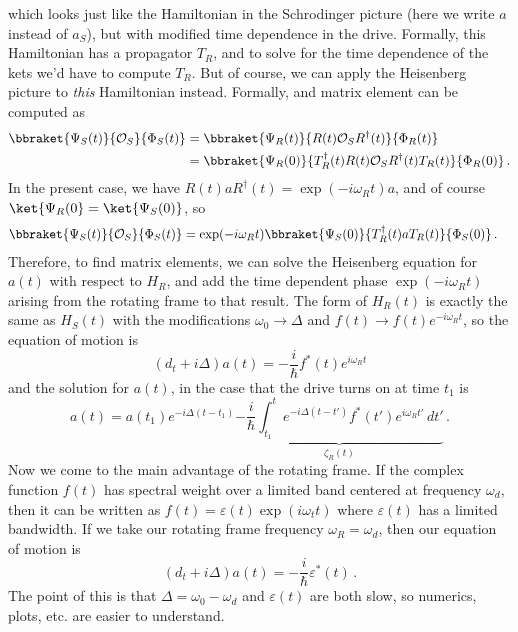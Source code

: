 which looks just like the Hamiltonian in the Schrodinger picture (here we write $a$ instead of $a_S$), but with modified time dependence in the drive.
Formally, this Hamiltonian has a propagator $T_R$, and to solve for the time dependence of the kets we'd have to compute $T_R$.
But of course, we can apply the Heisenberg picture to \emph{this} Hamiltonian instead.
Formally, and matrix element can be computed as
\begin{align*}
  \bbraket{\Psi_S(t)}{\mathcal{O}_S}{\Phi_S(t)}
  &= \bbraket{\Psi_R(t)}{R(t) \mathcal{O}_S R^\dagger(t)}{\Phi_R(t)} \\
  &= \bbraket{\Psi_R(0)}{T_R^\dagger(t) R(t) \mathcal{O}_S R^\dagger(t) T_R(t)}{\Phi_R(0)}
  \, .
\end{align*}
In the present case, we have $R(t) a R^\dagger(t) = \exp(-i \omega_R t) a$, and of course $\ket{\Psi_R(0} = \ket{\Psi_S(0)}$, so
\begin{align*}
  \bbraket{\Psi_S(t)}{\mathcal{O}_S}{\Phi_S(t)}
  &= \exp(-i \omega_R t) \bbraket{\Psi_S(0)}{T_R^\dagger(t) a T_R(t)}{\Phi_S(0)}
  \, .
\end{align*}
Therefore, to find matrix elements, we can solve the Heisenberg equation for $a(t)$ with respect to $H_R$, and add the time dependent phase $\exp(-i \omega_R t)$ arising from the rotating frame to that result.
The form of $H_R(t)$ is exactly the same as $H_S(t)$ with the modifications $\omega_0 \rightarrow \Delta$ and $f(t) \rightarrow f(t) e^{-i \omega_R t}$, so the equation of motion is
\begin{equation}
  (d_t + i \Delta) a(t) = - \frac{i}{\hbar} f^*(t) e^{i \omega_R t}
\end{equation}
and the solution for $a(t)$, in the case that the drive turns on at time $t_1$ is
\begin{equation}
  a(t) = a(t_1) e^{-i \Delta (t - t_1)}
  \underbrace{- \frac{i}{\hbar} \int_{t_1}^t e^{-i \Delta (t - t')} f^*(t') e^{i \omega_R t'} \, dt'}_{\zeta_R(t)}
  \, .
\end{equation}
Now we come to the main advantage of the rotating frame.
If the complex function $f(t)$ has spectral weight over a limited band centered at frequency $\omega_d$, then it can be written as $f(t) = \varepsilon(t) \exp(i \omega_t t)$ where $\varepsilon(t)$ has a limited bandwidth.
If we take our rotating frame frequency $\omega_R = \omega_d$, then our equation of motion is
\begin{equation}
  \left( d_t + i \Delta \right) a(t) = - \frac{i}{\hbar} \varepsilon^*(t)
  \, .
\end{equation}
The point of this is that $\Delta = \omega_0 - \omega_d$ and $\varepsilon(t)$ are both slow, so numerics, plots, etc. are easier to understand.

